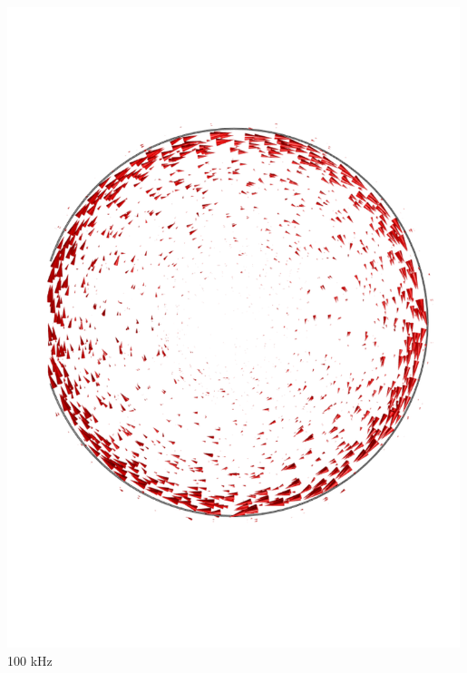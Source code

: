 \documentclass[compress]{beamer}
\begin{document}
\begin{frame}
\begin{columns}[totalwidth=\textwidth]
\begin{column}{.30\textwidth}
\includegraphics[width=0.99\textwidth]{Graphic/eddy_100khz.pdf}
{\small 100 kHz}
\end{column}
\end{columns}
\end{frame}
\end{document}
